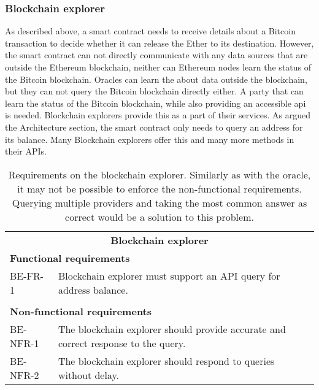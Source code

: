 \subsubsection{Blockchain explorer}
As described above, a smart contract needs to receive details about a Bitcoin transaction to decide whether it can release the Ether to its destination. However, the smart contract can not directly communicate with any data sources that are outside the Ethereum blockchain, neither can Ethereum nodes learn the status of the Bitcoin blockchain\footnotemark.
% 
% 
Oracles can learn the about data outside the blockchain, but they can not query the Bitcoin blockchain directly either\footnotemark. A party that can learn the status of the Bitcoin blockchain, while also providing an accessible \acrshort{api} is needed. Blockchain explorers provide this as a part of their services. As argued the Architecture section, the smart contract only needs to query an address for its balance. Many Blockchain explorers offer this and many more methods in their APIs.
% 
% 
\begin{table}[ht]
    \centering
    \begin{tabularx}{\textwidth}{|l X|}
    \hline
        \multicolumn{2}{|c|}{\textbf{Blockchain explorer}}\\
        \multicolumn{2}{|l|}{\textbf{Functional requirements}}\\
        BE-FR-1&Blockchain explorer must support an API query for address balance.\\
        &\\
        \multicolumn{2}{|l|}{\textbf{Non-functional requirements}}\\
        BE-NFR-1&The blockchain explorer should provide accurate and correct response to the query.\\
        BE-NFR-2&The blockchain explorer should respond to queries without delay.\\
    \hline
    \end{tabularx}
    \caption{Requirements on the blockchain explorer. Similarly as with the oracle, it may not be possible to enforce the non-functional requirements. Querying multiple providers and taking the most common answer as correct would be a solution to this problem.}
    \label{tab:reqs-block-explorer}
\end{table}

